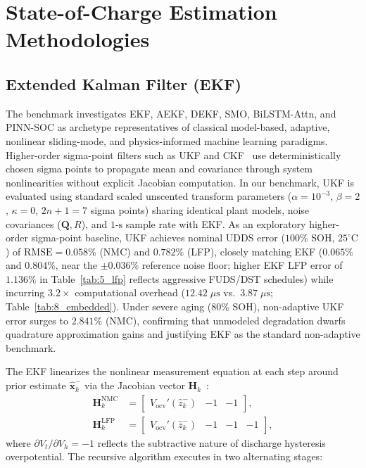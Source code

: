 \documentclass[balance,nocopyright,upint,varvw,hyphenate,barcolor=NavyBlue,nolists]{asmejour}
\begin{document}
\section{State-of-Charge Estimation Methodologies}

\subsection{Extended Kalman Filter (EKF)}
The benchmark investigates EKF, AEKF, DEKF, SMO, BiLSTM-Attn, and PINN-SOC as archetype representatives of classical model-based, adaptive, nonlinear sliding-mode, and physics-informed machine learning paradigms. Higher-order sigma-point filters such as UKF and CKF~\cite{Plett2006ukf,He2013ukf} use deterministically chosen sigma points to propagate mean and covariance through system nonlinearities without explicit Jacobian computation. In our benchmark, UKF is evaluated using standard scaled unscented transform parameters ($\alpha = 10^{-3}$, $\beta = 2$, $\kappa = 0$, $2n+1=7$ sigma points) sharing identical plant models, noise covariances ($\mathbf{Q}, R$), and $1\text{-s}$ sample rate with EKF. As an exploratory higher-order sigma-point baseline, UKF achieves nominal UDDS error ($100\%$ SOH, $25^\circ\text{C}$) of $\text{RMSE} = 0.058\%$ (NMC) and $0.782\%$ (LFP), closely matching EKF ($0.065\%$ and $0.804\%$, near the $\pm 0.036\%$ reference noise floor; higher EKF LFP error of $1.136\%$ in Table~\ref{tab:5_lfp} reflects aggressive FUDS/DST schedules) while incurring $3.2\times$ computational overhead ($12.42\;\mu\text{s}$ vs.\ $3.87\;\mu\text{s}$; Table~\ref{tab:8_embedded}). Under severe aging ($80\%$ SOH), non-adaptive UKF error surges to $2.841\%$ (NMC), confirming that unmodeled degradation dwarfs quadrature approximation gains and justifying EKF as the standard non-adaptive benchmark.

The EKF linearizes the nonlinear measurement equation at each step around prior estimate $\hat{\mathbf{x}}_k^-$ via the Jacobian vector $\mathbf{H}_k$~\cite{Plett2004part3}:
\begin{align}\label{eqn:ekf_jacobian}
\mathbf{H}_k^{\text{NMC}} &= \begin{bmatrix} V_{\text{ocv}}'(\hat{z}_k^-) & -1 & -1 \end{bmatrix}, \nonumber\\
\mathbf{H}_k^{\text{LFP}} &= \begin{bmatrix} V_{\text{ocv}}'(\hat{z}_k^-) & -1 & -1 & -1 \end{bmatrix},
\end{align}
where $\partial V_t / \partial V_h = -1$ reflects the subtractive nature of discharge hysteresis overpotential. The recursive algorithm executes in two alternating stages:
\end{document}
